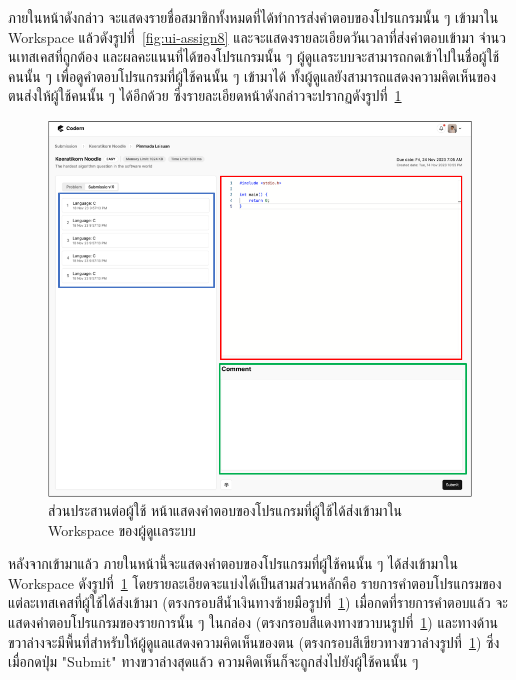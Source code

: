 \documentclass[12pt,one side,openright,a4paper]{cpe-thesis-th}
\newcommand{\thaijustify}[1]{%
  \par\hspace{30pt}\justifying
  #1
}
\begin{document}
\thaijustify{
  ภายในหน้าดังกล่าว จะแสดงรายชื่อสมาชิกทั้งหมดที่ได้ทำการส่งคำตอบของโปรแกรมนั้น ๆ เข้ามาใน Workspace แล้วดังรูปที่~\ref{fig:ui-assign8} และจะแสดงรายละเอียดวันเวลาที่ส่งคำตอบเข้ามา จำนวนเทสเคสที่ถูกต้อง และผลคะแนนที่ได้ของโปรแกรมนั้น ๆ ผู้ดูเเลระบบจะสามารถกดเข้าไปในชื่อผู้ใช้คนนั้น ๆ เพื่อดูคำตอบโปรแกรมที่ผู้ใช้คนนั้น ๆ เข้ามาได้ ทั้งผู้ดูแลยังสามารถแสดงความคิดเห็นของตนส่งให้ผู้ใช้คนนั้น ๆ ได้อีกด้วย ซึ่งรายละเอียดหน้าดังกล่าวจะปรากฏดังรูปที่~\ref{fig:ui-code3}
}
\hypertarget{ui-code3}{
  \begin{figure}[H]
    \centering
    \includegraphics[width=15cm]{figure/ui/ui-code3.png}
    \caption[ส่วนประสานต่อผู้ใช้ หน้าแสดงคำตอบของโปรแกรมที่ผู้ใช้ได้ส่งเข้ามาใน Workspace ของผู้ดูเเลระบบ]{ส่วนประสานต่อผู้ใช้ หน้าแสดงคำตอบของโปรแกรมที่ผู้ใช้ได้ส่งเข้ามาใน Workspace ของผู้ดูเเลระบบ}
    \label{fig:ui-code3}
  \end{figure}
}
\thaijustify{
  หลังจากเข้ามาแล้ว ภายในหน้านี้จะแสดงคำตอบของโปรแกรมที่ผู้ใช้คนนั้น ๆ ได้ส่งเข้ามาใน Workspace ดังรูปที่~\ref{fig:ui-code3} โดยรายละเอียดจะแบ่งได้เป็นสามส่วนหลักคือ รายการคำตอบโปรแกรมของแต่ละเทสเคสที่ผู้ใช้ได้ส่งเข้ามา (ตรงกรอบสีน้ำเงินทางซ้ายมือรูปที่~\ref{fig:ui-code3}) เมื่อกดที่รายการคำตอบแล้ว จะแสดงคำตอบโปรแกรมของรายการนั้น ๆ ในกล่อง (ตรงกรอบสีแดงทางขวาบนรูปที่~\ref{fig:ui-code3}) และทางด้านขวาล่างจะมีพื้นที่สำหรับให้ผู้ดูแลแสดงความคิดเห็นของตน (ตรงกรอบสีเขียวทางขวาล่างรูปที่~\ref{fig:ui-code3}) ซึ่งเมื่อกดปุ่ม "Submit" ทางขวาล่างสุดแล้ว ความคิดเห็นก็จะถูกส่งไปยังผู้ใช้คนนั้น ๆ
}
\end{document}
